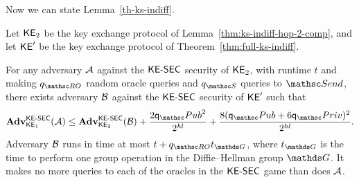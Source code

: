 Now we can state Lemma~\ref{th-ks-indiff}.
\begin{lemma}\label{th-ks-indiff}
	Let $\mathsf{KE}_2$ be the key exchange protocol of Lemma~\ref{thm:ks-indiff-hop-2-comp}, and let $\mathsf{KE}'$ be the key exchange protocol of Theorem~\ref{thm:full-ks-indiff}. 
	
	For any adversary $\mathcal{A}$ against the $\mathsf{KE{\text{\normalfont-}}SEC}$ security of $\mathsf{KE}_2$, with runtime $t$ and making $\qRO$ random oracle queries and $\qSend$ queries to $\Send$, there exists adversary $\mathcal{B}$ against the $\mathsf{KE{\text{\normalfont-}}SEC}$ security of $\mathsf{KE}'$ such that
	\[
	\genAdv{\KESEC}{\KE_1}{\advA}
	\leq \genAdv{\KESEC}{\KE_2}{\advB} + \frac{2\qPub^2}{2^{\hashlen}} + \frac{8(\qPub+6\qPriv)^2}{2^{\hashlen}}.
	\]
	Adversary $\mathcal{B}$ runs in time at most $t + \qRO t_{\G}$, where $t_{\G}$ is the time to perform one group operation in the Diffie--Hellman group $\G$. 
	It makes no more queries to each of the oracles in the $\mathsf{KE{\text{\normalfont-}}SEC}$ game than does $\mathcal{A}$.
\end{lemma}

